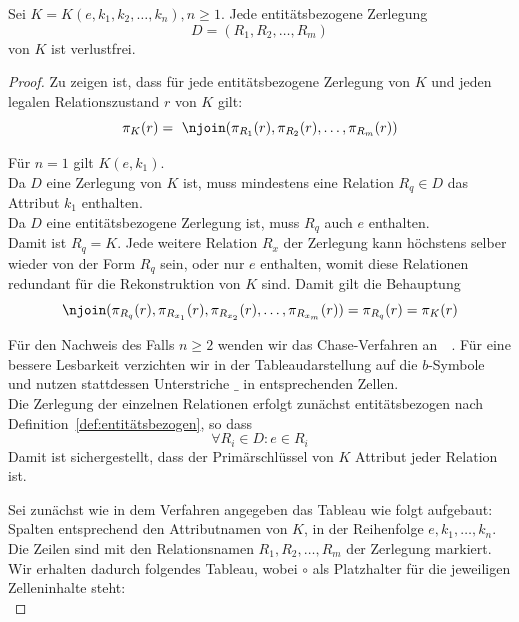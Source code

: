 \bigskip
\begin{lemma}\label{lem:k_zerlegung_ist_verlustfrei}
    Sei $K = K(e, k_1, k_2, \ldots, k_n), n \geq 1$. Jede entitätsbezogene Zerlegung
    \[
        D = (R_{1}, R_{2}, \ldots, R_{m})
    \]
    von $K$ ist verlustfrei.
\end{lemma}

\medskip
\begin{proof}
    Zu zeigen ist, dass für jede entitätsbezogene Zerlegung von $K$ und jeden legalen Relationszustand $r$ von $K$ gilt:
    \[
        \pi_{{K}}(r) =\ \njoin (\pi_{R_{1}}(r), \pi_{R_{2}}(r), \ldots, \pi_{R_{m}}(r))
    \]

    \noindent
    Für $n = 1$ gilt $K(e, k_1)$.\\
    Da $D$ eine Zerlegung von $K$ ist, muss mindestens eine Relation $R_q \in D$ das Attribut $k_1$ enthalten.\\
    Da $D$ eine entitätsbezogene Zerlegung ist, muss $R_q$ auch $e$ enthalten.\\
    Damit ist $R_q = K$. Jede weitere Relation $R_x$ der Zerlegung kann höchstens selber wieder von der Form $R_q$ sein, oder nur
    $e$ enthalten, womit diese Relationen redundant für die Rekonstruktion von $K$ sind.
    Damit gilt die Behauptung
    \[
         \njoin (\pi_{R_q}(r), \pi_{R_{x_1}}(r), \pi_{R_{x_2}}(r), \ldots, \pi_{R_{x_m}}(r)) = \pi_{R_q}(r) = \pi_{{K}}(r)
    \]

    \noindent
    Für den Nachweis des Falls $n \geq 2$ wenden wir das Chase-Verfahren an~\cite{ABU79}~\cite[Algorithmus 10.2, S. 342]{EN11}.
    Für eine bessere Lesbarkeit verzichten wir in der Tableaudarstellung auf die $b$-Symbole und nutzen stattdessen Unterstriche $\_$ in entsprechenden Zellen.\\

    \noindent
    Die Zerlegung der einzelnen Relationen erfolgt zunächst entitätsbezogen nach Definition~\ref{def:entitätsbezogen}, so dass
    \[
        \forall R_{i} \in D : e \in R_{i}
    \]
    Damit ist sichergestellt, dass der Primärschlüssel von $K$ Attribut jeder Relation ist.

    \noindent
    Sei zunächst wie in dem Verfahren angegeben das Tableau wie folgt aufgebaut:
    Spalten entsprechend den Attributnamen von $K$, in der Reihenfolge $e, k_1, \ldots, k_n$.
    Die Zeilen sind mit den Relationsnamen $R_{1}, R_{2}, \ldots, R_{m}$ der Zerlegung markiert.
    Wir erhalten dadurch folgendes Tableau, wobei $\circ$ als Platzhalter für die jeweiligen Zelleninhalte steht:\\


\end{proof}
